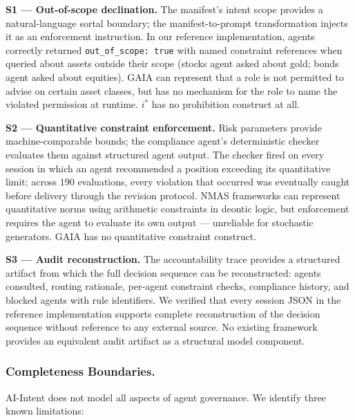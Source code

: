 \documentclass[runningheads]{llncs}
\begin{document}
\textbf{S1 — Out-of-scope declination.} The manifest's intent scope
provides a natural-language sortal boundary; the manifest-to-prompt
transformation injects it as an enforcement instruction. In our reference
implementation, agents correctly returned \texttt{out\_of\_scope: true}
with named constraint references when queried about assets outside their
scope (stocks agent asked about gold; bonds agent asked about equities).
GAIA can represent that a role is not permitted to advise on certain
asset classes, but has no mechanism for the role to name the violated
permission at runtime. $i^*$ has no prohibition construct at all.

\textbf{S2 — Quantitative constraint enforcement.} Risk parameters
provide machine-comparable bounds; the compliance agent's deterministic
checker evaluates them against structured agent output. The checker fired
on every session in which an agent recommended a position exceeding its
quantitative limit; across 190 evaluations, every violation that occurred
was eventually caught before delivery through the revision protocol.
NMAS frameworks can represent quantitative norms using arithmetic
constraints in deontic logic, but enforcement requires the agent to
evaluate its own output --- unreliable for stochastic generators. GAIA
has no quantitative constraint construct.

\textbf{S3 — Audit reconstruction.} The accountability trace provides
a structured artifact from which the full decision sequence can be
reconstructed: agents consulted, routing rationale, per-agent constraint
checks, compliance history, and blocked agents with rule identifiers. We
verified that every session JSON in the reference implementation supports
complete reconstruction of the decision sequence without reference to any
external source. No existing framework provides an equivalent audit
artifact as a structural model component.

\subsubsection{Completeness Boundaries.}

AI-Intent does not model all aspects of agent governance. We identify
three known limitations:
\end{document}
